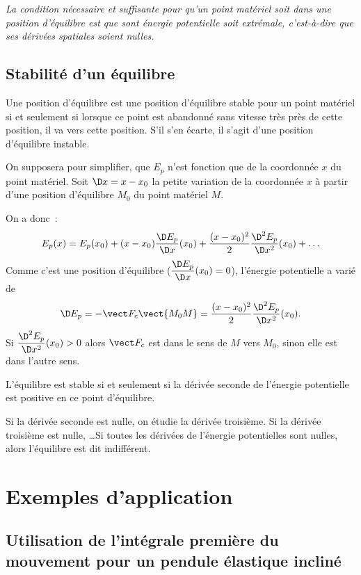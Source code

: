 \emph{La condition nécessaire et suffisante pour qu'un point matériel soit dans une position d'équilibre est que sont énergie potentielle soit extrémale, c'est-à-dire que ses dérivées spatiales soient nulles.}

\subsection{Stabilité d'un équilibre}
\label{chap4-subsec:stabiliteequilibre}

\begin{defdef}
  Une position d'équilibre est une position d'équilibre stable pour un point matériel si et seulement si lorsque ce point est abandonné sans vitesse très près de cette position, il va vers cette position. S'il s'en écarte, il s'agit d'une position d'équilibre instable.
\end{defdef}

On supposera pour simplifier, que $E_p$ n'est fonction que de la coordonnée $x$ du point matériel. Soit $\D x = x-x_0$ la petite variation de la coordonnée $x$ à partir d'une position d'équilibre $M_0$ du point matériel $M$. 

On a donc~:
\begin{equation}
  E_p(x) = E_p(x_0) +(x-x_0)\derived{E_p}{x}(x_0) +\frac{(x-x_0)^2}{2}\deriveds{E_p}{x}(x_0) + \ldots
\end{equation}
Comme c'est une position d'équilibre ($\derived{E_p}{x}(x_0)=0$), l'énergie potentielle a varié de
\begin{equation}
  \D E_p = -\vF_c \vect{M_0M} = \frac{(x-x_0)^2}{2}\deriveds{E_p}{x}(x_0).
\end{equation}
Si $\deriveds{E_p}{x}(x_0)>0$ alors $\vF_c$ est dans le sens de $M$ vers $M_0$, sinon elle est dans l'autre sens.

L'équilibre est stable si et seulement si la dérivée seconde de l'énergie potentielle est positive en ce point d'équilibre.

Si la dérivée seconde est nulle, on étudie la dérivée troisième. Si la dérivée troisième est nulle, \ldots Si toutes les dérivées de l'énergie potentielles sont nulles, alors l'équilibre est dit indifférent.

\section{Exemples d'application}
\label{chap4-sec:exemplesdapplication}

\subsection{Utilisation de l'intégrale première du mouvement pour un pendule élastique incliné}
\label{chap4-subsec:penduleelastique}

